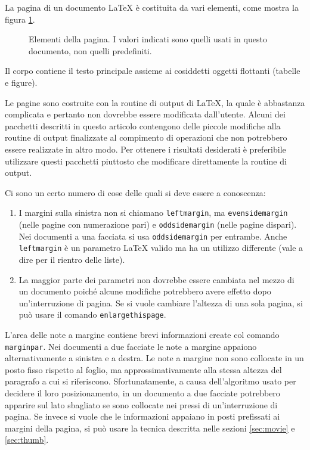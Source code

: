 \documentclass[a4paper,italian]{article}
\def\latex/{\protect\LaTeX{}}
\newcommand{\bs}{\symbol{'134}}
\newcommand{\Cmd}[1]{\texttt{\def\{{\char`\{}\def\}{\char`\}}\bs#1}}
\begin{document}
La pagina di un documento \LaTeX{} \`e costituita da vari elementi,
come mostra la figura \ref{fig:layout}. 
\begin{figure}[htbp]
  \begin{center}
    \leavevmode
    \layout
    \vspace{3cm}
    \caption{Elementi della pagina. I valori indicati sono quelli
    usati in questo documento, non quelli predefiniti.}
    \label{fig:layout}
  \end{center}
\end{figure}
\thispagestyle{plain}
Il corpo contiene il testo principale assieme ai cosiddetti oggetti flottanti
(tabelle e figure).

Le pagine sono costruite con la routine di output di \LaTeX, la quale
\`e abbastanza complicata e pertanto non dovrebbe essere modificata
dall'utente.  Alcuni dei pacchetti descritti in questo articolo
contengono delle piccole modifiche alla routine di output finalizzate
al compimento di operazioni che non potrebbero essere realizzate in
altro modo. Per ottenere i risultati desiderati \`e preferibile
utilizzare questi pacchetti piuttosto che modificare direttamente la
routine di output.

Ci sono un certo numero di cose delle quali si deve essere a conoscenza:
\begin{enumerate}

\item I margini sulla sinistra non si chiamano \Cmd{leftmargin}, ma
  \Cmd{evensidemargin} (nelle pagine con numerazione pari) e \Cmd{oddsidemargin}
  (nelle pagine dispari). Nei documenti a una facciata si usa
  \Cmd{oddsidemargin} per entrambe.  Anche \Cmd{leftmargin} \`e un parametro
  \latex/ valido ma ha un utilizzo differente (vale a dire per il rientro
  delle liste).
\item La maggior parte dei parametri non dovrebbe essere cambiata nel
  mezzo di un documento poich\'e alcune modifiche potrebbero avere effetto
  dopo un'interruzione di pagina.
  Se si vuole cambiare l'altezza di una sola pagina, si pu\`o usare il
  comando \Cmd{enlargethispage}.
\end{enumerate}

L'area delle note a margine contiene brevi informazioni
create col comando \Cmd{marginpar}. Nei documenti a due facciate le
note a margine appaiono alternativamente a sinistra e a destra.  Le
note a margine non sono collocate in un posto fisso rispetto al foglio, ma
approssimativamente alla stessa altezza del paragrafo a cui si riferiscono.
Sfortunatamente, a causa dell'algoritmo usato per decidere il loro
posizionamento, in un documento a due facciate
potrebbero apparire sul lato sbagliato se sono collocate nei pressi di
un'interruzione di pagina.
Se invece si vuole che le informazioni appaiano in posti
prefissati ai margini della pagina, si pu\`o usare la tecnica
descritta nelle sezioni \ref{sec:movie} e \ref{sec:thumb}.
\end{document}
